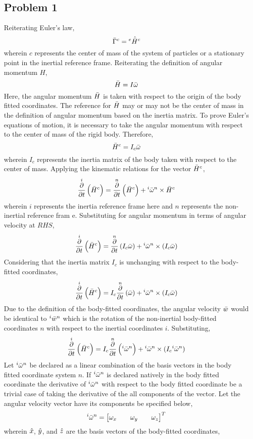 \documentclass[class=report, 12pt, crop=false]{standalone}
\begin{document}
\begin{center}
\section{Problem 1}
\begin{comment}
\end{comment}

Reiterating Euler's law,
$$\bar{\Gamma}^{c} = {}^{e}\dot{\bar{H}}^{c}$$
wherein $c$ represents the center of mass of the system of particles or a stationary point in the inertial reference frame. Reiterating the definition of angular momentum $H$,
$$\bar{H} = I \bar{\omega}$$
Here, the angular momentum $\bar{H}$ is taken with respect to the origin of the body fitted coordinates. The reference for $\bar{H}$ may or may not be the center of mass in the definition of angular momentum based on the inertia matrix. To prove Euler's equations of motion, it is necessary to take the angular momentum with respect to the center of mass of the rigid body. Therefore,
$$\bar{H}^{c} = I_c \bar{\omega}$$
wherein $I_c$ represents the inertia matrix of the body taken with respect to the center of mass. Applying
 the kinematic relations for the vector $\bar{H}^c$,
$$\overset{i}{\frac{\partial}{\partial t}}\left(\bar{H}^c\right) = \overset{n}{\frac{\partial}{\partial t}}\left(\bar{H}^c\right) + {}^i\bar{\omega}^n\times\bar{H}^{c}$$
wherein $i$ represents the inertia reference frame here and $n$ represents the non-inertial reference fram
e. Substituting for angular momentum in terms of angular velocity at $RHS$,
$$\overset{i}{\frac{\partial}{\partial t}}\left(\bar{H}^c\right) = \overset{n}{\frac{\partial}{\partial t}}\left(I_c \bar{\omega}\right) + {}^i\bar{\omega}^n\times (I_c \bar{\omega})$$
Considering that the inertia matrix $I_c$ is unchanging with respect to the body-fitted coordinates,
$$\overset{i}{\frac{\partial}{\partial t}}\left(\bar{H}^c\right) = I_c\overset{n}{\frac{\partial}{\partial t}}\left(\bar{\omega}\right) + {}^i\bar{\omega}^n\times (I_c \bar{\omega})$$
Due to the definition of the body-fitted coordinates, the angular velocity $\bar{w}$ would be identical to $
{}^i\bar{w}^n$ which is the rotation of the non-inertial body-fitted coordinates $n$ with respect to the inertial coordinates $i$. Substituting,
$$\overset{i}{\frac{\partial}{\partial t}}\left(\bar{H}^c\right) = I_c\overset{n}{\frac{\partial}{\partial t}}\left({}^i\bar{\omega}^n\right) + {}^i\bar{\omega}^n\times (I_c {}^i\bar{\omega}^n)$$
Let ${}^i\bar{\omega}^n$ be declared as a linear combination of the basis vectors in the body fitted coordinate
system $n$. If ${}^i\bar{\omega}^n$ is declared natively in the body fitted coordinate the derivative of ${}^i\bar{\omega}^n$ with respect to the body fitted coordinate be a trivial case of taking the derivative of the all components of the vector.  Let the angular velocity vector have its components be specified below,
$${}^i\bar{\omega}^n = \begin{bmatrix}\omega_x && \omega_y && \omega_z\end{bmatrix}^T$$
wherein $\hat{x}$, $\hat{y}$, and $\hat{z}$ are the basis vectors of the body-fitted coordinates,


\end{center}
\end{document}
